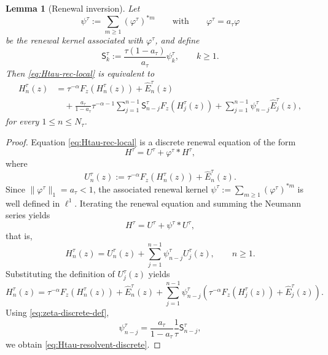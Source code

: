 \documentclass[letterpaper]{article}
\numberwithin{equation}{section}
\newtheorem{lemma}[theorem]{Lemma}
\theoremstyle{definition}
\theoremstyle{remark}
\begin{document}


\begin{lemma}[Renewal inversion]
\label{lem:renewal-inversion}
Let
\[
  \psi^\tau:=\sum_{m\ge1}(\varphi^\tau)^{*m}
  \qquad\text{with}\qquad
  \varphi^\tau=a_\tau\varphi
\]
be the renewal kernel associated with $\varphi^\tau$, and define
\begin{equation}\label{eq:zeta-discrete-def}
  \mathsf S_k^\tau
  :=
  \frac{\tau(1-a_\tau)}{a_\tau}\psi_k^\tau,
  \qquad k\ge1.
\end{equation}
Then \eqref{eq:Htau-rec-local} is equivalent to
\begin{equation}\label{eq:Htau-resolvent-discrete}
\begin{aligned}
  H_n^\tau(z)
  &=
  \tau^{-\alpha}F_z(H_n^\tau(z))
  +\widehat E_n^\tau(z)
\\
  &\quad
  +
  \frac{a_\tau}{1-a_\tau}\tau^{-\alpha-1}
  \sum_{j=1}^{n-1}\mathsf S_{n-j}^\tau F_z(H_j^\tau(z))
  +
  \sum_{j=1}^{n-1}\psi_{n-j}^\tau\widehat E_j^\tau(z),
\end{aligned}
\end{equation}
for every $1\le n\le N_\tau$.
\end{lemma}

\begin{proof}
Equation \eqref{eq:Htau-rec-local} is a discrete renewal equation of the form
\[
  H^\tau = U^\tau + \varphi^\tau * H^\tau,
\]
where
\[
  U_n^\tau(z):=\tau^{-\alpha}F_z(H_n^\tau(z))+\widehat E_n^\tau(z).
\]
Since $\|\varphi^\tau\|_1=a_\tau<1$, the associated renewal kernel
$\psi^\tau:=\sum_{m\ge1}(\varphi^\tau)^{*m}$
is well defined in $\ell^1$. Iterating the renewal equation and summing the
Neumann series yields
\[
  H^\tau = U^\tau + \psi^\tau * U^\tau,
\]
that is,
\[
  H_n^\tau(z)
  =
  U_n^\tau(z)
  +\sum_{j=1}^{n-1}\psi_{n-j}^\tau U_j^\tau(z),
  \qquad n\ge1.
\]
Substituting the definition of $U_j^\tau(z)$ yields
\[
  H_n^\tau(z)
  =
  \tau^{-\alpha}F_z(H_n^\tau(z))
  +\widehat E_n^\tau(z)
  +\sum_{j=1}^{n-1}\psi_{n-j}^\tau
   \left(
     \tau^{-\alpha}F_z(H_j^\tau(z))+\widehat E_j^\tau(z)
   \right).
\]
Using \eqref{eq:zeta-discrete-def},
\[
  \psi_{n-j}^\tau
  =
  \frac{a_\tau}{1-a_\tau}\frac1\tau \mathsf{S}_{n-j}^\tau,
\]
we obtain \eqref{eq:Htau-resolvent-discrete}.
\end{proof}
\end{document}
